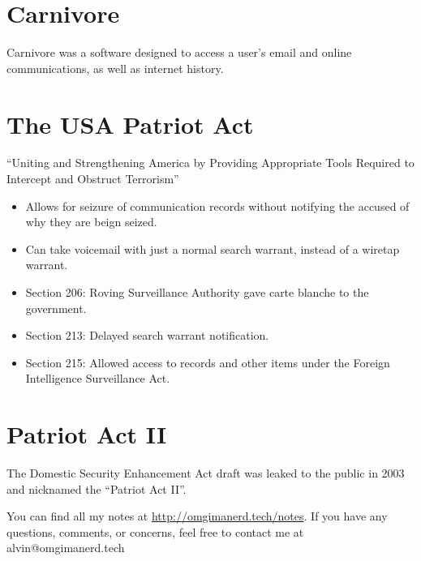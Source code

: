 \documentclass[letterpaper, 12pt]{article}
\begin{document}
\section*{Carnivore}
Carnivore was a software designed to access a user's email and online
communications, as well as internet history.

\section*{The USA Patriot Act}
``Uniting and Strengthening America by Providing Appropriate Tools Required to
Intercept and Obstruct Terrorism''
\begin{itemize}
  \item Allows for seizure of communication records without notifying the
    accused of why they are beign seized.
  \item Can take voicemail with just a normal search warrant, instead of a
    wiretap warrant.
  \item Section 206: Roving Surveillance Authority gave carte blanche to the
    government.
  \item Section 213: Delayed search warrant notification.
  \item Section 215: Allowed access to records and other items under the
    Foreign Intelligence Surveillance Act.
\end{itemize}

\section*{Patriot Act II}
The Domestic Security Enhancement Act draft was leaked to the public in 2003
and nicknamed the ``Patriot Act II''.

\begin{center}
  You can find all my notes at \url{http://omgimanerd.tech/notes}. If you have
  any questions, comments, or concerns, feel free to contact me at
  alvin@omgimanerd.tech
\end{center}
\end{document}

